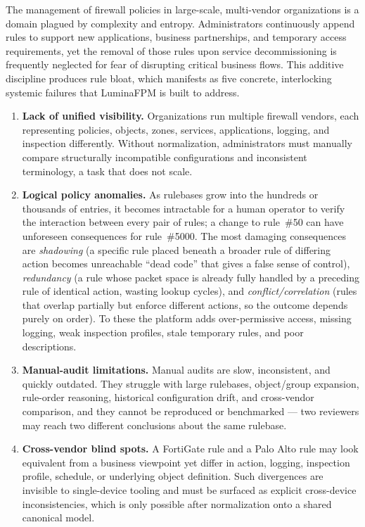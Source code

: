 \documentclass[12pt,a4paper]{report}
\renewcommand{\_}{\textunderscore\allowbreak}
\begin{document}
The management of firewall policies in large-scale, multi-vendor organizations is a domain plagued by complexity and entropy. Administrators continuously append rules to support new applications, business partnerships, and temporary access requirements, yet the removal of those rules upon service decommissioning is frequently neglected for fear of disrupting critical business flows. This additive discipline produces rule bloat, which manifests as five concrete, interlocking systemic failures that LuminaFPM is built to address.

\begin{enumerate}[leftmargin=1.6em, label=\textbf{P\arabic*.}]
  \item \textbf{Lack of unified visibility.} Organizations run multiple firewall vendors, each representing policies, objects, zones, services, applications, logging, and inspection differently. Without normalization, administrators must manually compare structurally incompatible configurations and inconsistent terminology, a task that does not scale.
  \item \textbf{Logical policy anomalies.} As rulebases grow into the hundreds or thousands of entries, it becomes intractable for a human operator to verify the interaction between every pair of rules; a change to rule~\#50 can have unforeseen consequences for rule~\#5000. The most damaging consequences are \emph{shadowing} (a specific rule placed beneath a broader rule of differing action becomes unreachable ``dead code'' that gives a false sense of control), \emph{redundancy} (a rule whose packet space is already fully handled by a preceding rule of identical action, wasting lookup cycles), and \emph{conflict/correlation} (rules that overlap partially but enforce different actions, so the outcome depends purely on order). To these the platform adds over-permissive access, missing logging, weak inspection profiles, stale temporary rules, and poor descriptions.
  \item \textbf{Manual-audit limitations.} Manual audits are slow, inconsistent, and quickly outdated. They struggle with large rulebases, object/group expansion, rule-order reasoning, historical configuration drift, and cross-vendor comparison, and they cannot be reproduced or benchmarked --- two reviewers may reach two different conclusions about the same rulebase.
  \item \textbf{Cross-vendor blind spots.} A FortiGate rule and a Palo Alto rule may look equivalent from a business viewpoint yet differ in action, logging, inspection profile, schedule, or underlying object definition. Such divergences are invisible to single-device tooling and must be surfaced as explicit cross-device inconsistencies, which is only possible after normalization onto a shared canonical model.

\end{enumerate}
\end{document}
